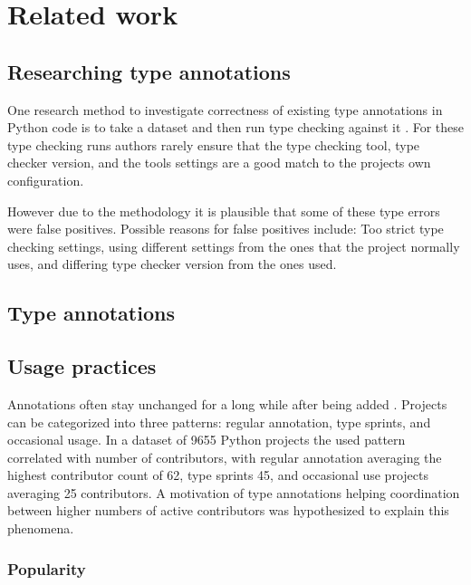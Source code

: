 \chapter{Related work\label{related_work}}

\section{Researching type annotations}

One research method to investigate correctness of existing type annotations in Python code is to take a dataset and then run type checking against it \cite{rak-amnouykit_taleoftwo_2020, di_grazia_evolution_2022}. For these type checking runs authors rarely ensure that the type checking tool, type checker version, and the tools settings are a good match to the projects own configuration.

However due to the methodology it is plausible that some of these type errors were false positives. Possible reasons for false positives include: Too strict type checking settings, using different settings from the ones that the project normally uses, and differing type checker version from the ones used.



\section{Type annotations}

\section{Usage practices}

Annotations often stay unchanged for a long while after being added \cite{di_grazia_evolution_2022}. Projects can be categorized into three patterns: regular annotation, type sprints, and occasional usage. In a dataset of 9655 Python projects the used pattern correlated with number of contributors, with regular annotation averaging the highest contributor count of 62, type sprints 45, and occasional use projects averaging 25 contributors. A motivation of type annotations helping coordination between higher numbers of active contributors was hypothesized to explain this phenomena. 

\subsection{Popularity}

